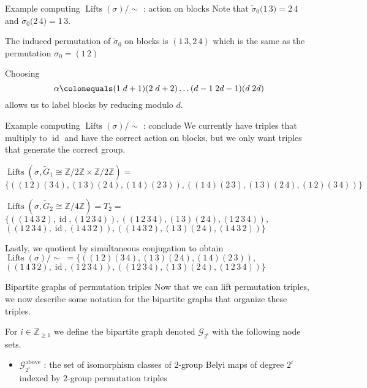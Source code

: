 \documentclass[xcolor=dvipsnames,handout]{beamer}
\theoremstyle{plain}
\newcommand{\ZZ}{\mathbb Z}
\newcommand{\wt}[1]{\widetilde{#1}}
\DeclareMathOperator{\Lifts}{Lifts}
\DeclareMathOperator{\id}{id}
\begin{document}
{\begin{frame}{Example computing $\Lifts(\sigma)/\!\!\sim$ : action on blocks}
      Note that
      $\wt{\sigma}_0\Big(\boxed{1\,3}\Big) = \boxed{2\,4}$
      and
      $\wt{\sigma}_0\Big(\boxed{2\,4}\Big) = \boxed{1\,3}$.
      \pause\par
      The induced permutation
      of $\wt{\sigma}_0$ on blocks is
      $\left(\boxed{1\,3},\boxed{2\,4}\right)$
      which is the same as the
      permutation $\sigma_0 = (1\,2)$
      \pause\par
      Choosing
      \[
        \alpha\colonequals
        (1\;d+1)(2\;d+2)\dots
        (d-1\;2d-1)(d\;2d)
      \]
      allows us to label blocks by reducing modulo $d$.
    \end{frame}
    \begin{frame}{Example computing $\Lifts(\sigma)/\!\!\sim$ : conclude}
      We currently have triples that multiply to $\id$
      and have the correct action on blocks,
      but we only want triples that
      generate the correct group.
      \pause\par
      $\Lifts(\sigma,\wt{G}_1\cong\ZZ/2\ZZ\times\ZZ/2\ZZ)=$
      $\Big\{ ((1\,2)(3\,4), (1\,3)(2\,4), (1\,4)(2\,3)),
      ((1\,4)(2\,3), (1\,3)(2\,4), (1\,2)(3\,4)) \Big\}$
      \pause\par
      $\Lifts(\sigma,\wt{G}_2\cong\ZZ/4\ZZ)=T_2=$
      $\Big\{ ((1\,4\,3\,2), \id, (1\,2\,3\,4)),
      ((1\,2\,3\,4), (1\,3)(2\,4), (1\,2\,3\,4)),$
      $((1\,2\,3\,4), \id, (1\,4\,3\,2)),
      ((1\,4\,3\,2), (1\,3)(2\,4), (1\,4\,3\,2)) \Big\}$
      \pause\par
      Lastly, we quotient by simultaneous conjugation to obtain
      $\Lifts(\sigma)/\!\!\sim \;=\Big\{
      ((1\,2)(3\,4),(1\,3)(2\,4),(1\,4)(2\,3)),$
      $((1\,4\,3\,2),\id,(1\,2\,3\,4)),
      ((1\,2\,3\,4),(1\,3)(2\,4),(1\,2\,3\,4)) \Big\}$
    \end{frame}
    \begin{frame}{Bipartite graphs of permutation triples}
      Now that we can lift permutation triples,
      we now describe some notation for the bipartite
      graphs that organize these triples.
      \pause\par
      For $i\in\ZZ_{\geq 1}$ we define the bipartite
      graph denoted $\mathscr{G}_{2^i}$ with the following
      node sets.
      \begin{itemize}
        \item
          $\mathscr{G}_{2^i}^\text{above}$ :
          the set of isomorphism classes of $2$-group Belyi maps
          of degree $2^i$
          indexed by $2$-group permutation triples

\end{itemize}
\end{frame}}
\end{document}
